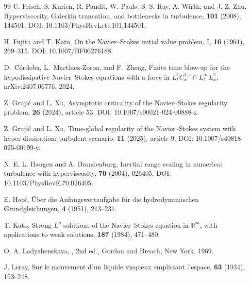 \documentclass[11pt]{article}
\theoremstyle{definition}
\theoremstyle{remark}
\newcommand{\R}{\mathbb{R}}
\begin{document}
\begin{thebibliography}{99}
U. Frisch, S. Kurien, R. Pandit, W. Pauls, S. S. Ray, A. Wirth, and J.-Z. Zhu,
\newblock Hyperviscosity, Galerkin truncation, and bottlenecks in turbulence,
 \textbf{101} (2008), 144501.
\newblock DOI: 10.1103/PhysRevLett.101.144501.

H. Fujita and T. Kato,
\newblock On the Navier--Stokes initial value problem. I,
 \textbf{16} (1964), 269--315.
\newblock DOI: 10.1007/BF00276188.

D.~C\'ordoba, L.~Mart\'inez-Zoroa, and F.~Zheng,
\newblock Finite time blow-up for the hypodissipative Navier--Stokes equations with a force in $L^1_t C_x^{1,\varepsilon}\cap L^\infty_tL_x^2$,
\newblock arXiv:2407.06776, 2024.


Z. Gruji\'c and L. Xu,
\newblock Asymptotic criticality of the Navier--Stokes regularity problem,
 \textbf{26} (2024), article 53.
\newblock DOI: 10.1007/s00021-024-00888-x.

Z. Gruji\'c and L. Xu,
\newblock Time-global regularity of the Navier--Stokes system with hyper-dissipation: turbulent scenario,
 \textbf{11} (2025), article 9.
\newblock DOI: 10.1007/s40818-025-00199-y.

N. E. L. Haugen and A. Brandenburg,
\newblock Inertial range scaling in numerical turbulence with hyperviscosity,
 \textbf{70} (2004), 026405.
\newblock DOI: 10.1103/PhysRevE.70.026405.

E. Hopf,
\newblock \"Uber die Anfangswertaufgabe f\"ur die hydrodynamischen Grundgleichungen,
 \textbf{4} (1951), 213--231.

T. Kato,
\newblock Strong $L^p$-solutions of the Navier--Stokes equation in $\R^m$, with applications to weak solutions,
 \textbf{187} (1984), 471--480.

O. A. Ladyzhenskaya,
,
\newblock 2nd ed., Gordon and Breach, New York, 1969.

J. Leray,
\newblock Sur le mouvement d'un liquide visqueux emplissant l'espace,
 \textbf{63} (1934), 193--248.


\end{thebibliography}
\end{document}
